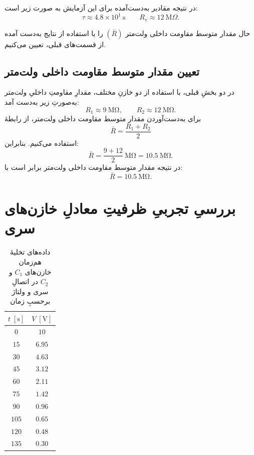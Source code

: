 \documentclass[a4paper, 11pt]{article}
\begin{document}
در نتیجه مقادیر به‌دست‌آمده برای این آزمایش به صورت زیر است:
\begin{equation}
\boxed{\tau \approx 4.8\times10^{1}\ \mathrm{s}}
\qquad
\boxed{R_\mathrm{v} \approx 12~\mathrm{M}\Omega}.
\end{equation}



حال مقدار متوسط مقاومت داخلی ولت‌متر $(\bar{R})$ را با استفاده از نتایج به‌دست آمده از قسمت‌های قبلی، تعیین می‌کنیم.

\subsection*{تعیین مقدار متوسط مقاومت داخلی ولت‌متر}

در دو بخشِ قبلی، با استفاده از دو خازنِ مختلف، مقدارِ مقاومتِ داخلیِ ولت‌متر به‌صورتِ زیر به‌دست آمد:
\[
R_1 \approx 9~\mathrm{M\Omega}, \qquad
R_2 \approx 12~\mathrm{M\Omega}.
\]
برای به‌دست‌آوردن مقدار متوسط مقاومت داخلی ولت‌متر، از رابطهٔ
\[
\bar{R} = \frac{R_1 + R_2}{2}
\]
استفاده می‌کنیم. بنابراین:
\[
\bar{R} = \frac{9 + 12}{2}~\mathrm{M\Omega}
       = 10.5~\mathrm{M\Omega}.
\]
در نتیجه مقدار متوسط مقاومت داخلی ولت‌متر برابر است با:
\[
\boxed{\bar{R} = 10.5~\mathrm{M\Omega}}.
\]


\section{بررسیِ تجربیِ ظرفیتِ معادلِ خازن‌های سری}
\begin{table}

\caption{داده‌های تخلیهٔ هم‌زمان خازن‌های \(C_1\) و \(C_2\) در اتصالِ سری و ولتاژ برحسبِ زمان}
\label{tab3}
\centering
\begin{tabular}{cc}
\hline
$t \;[\mathrm{s}]$ & $V \;[\mathrm{V}]$ \\
\hline
  $0$ & $10$ \\
 $15$ & $6.95$ \\
 $30$ & $4.63$ \\
 $45$ & $3.12$ \\
 $60$ & $2.11$ \\
 $75$ & $1.42$ \\
 $90$ & $0.96$ \\
$105$ & $0.65$ \\
$120$ & $0.48$ \\
$135$ & $0.30$ \\
\hline
\end{tabular}
\end{table}
\end{document}
